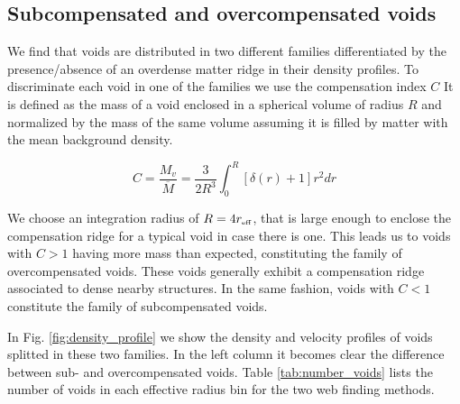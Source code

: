 \documentclass[a4,useAMS,usenatbib,usegraphicx]{mn2e}
\newcommand{\eq}[2]{\begin{equation} \label{eq:#1} #2 \end{equation}}
\newcommand{\reff}{{\ifmmode{r_{\mbox{\tiny eff}}}\else{$r_{\mbox{\tiny eff}}$}\fi}}
\begin{document}
\subsection{Subcompensated and overcompensated voids}
\label{subsec:enclosedmass}

We find that voids are distributed in two different families
differentiated by the 
presence/absence of an overdense matter ridge in their density
profiles. 
To discriminate each void in one of the families we use the
compensation  index $C$
It is defined as the mass of a void enclosed in a spherical volume of
radius $R$ and normalized by the mass of the same volume assuming
it is filled by matter with the mean background density.

\eq{compensation}
{C= \frac{M_v}{\overline{M}} = \frac{3}{2R^{3}} \int_0^{R} [\delta(r) + 1] r^2 dr}

We choose an integration radius of $R=4\reff$, that is large enough to 
enclose the compensation ridge for a typical void in case there is one. 
This leads us to voids with $C>1$ having more mass than expected, 
constituting the family of overcompensated voids. 
These voids generally  exhibit a compensation ridge associated to
dense nearby structures. 
In the same fashion, voids with $C<1$ constitute the family
of  subcompensated voids. 

In Fig. \ref{fig:density_profile} we show the density and velocity profiles
of voids splitted in these two families. 
In the left column it becomes clear the difference between sub- and
overcompensated voids. 
Table \ref{tab:number_voids} lists the number of voids in 
each effective radius bin for the two web finding methods.
\end{document}
